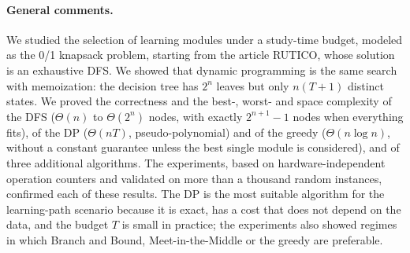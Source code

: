 \paragraph{General comments.} We studied the selection of learning modules under a study-time budget, modeled as the 0/1 knapsack problem, starting from the article RUTICO, whose solution is an exhaustive DFS. We showed that dynamic programming is the same search with memoization: the decision tree has $2^n$ leaves but only $n(T+1)$ distinct states. We proved the correctness and the best-, worst- and space complexity of the DFS ($\Theta(n)$ to $\Theta(2^n)$ nodes, with exactly $2^{n+1}-1$ nodes when everything fits), of the DP ($\Theta(nT)$, pseudo-polynomial) and of the greedy ($\Theta(n\log n)$, without a constant guarantee unless the best single module is considered), and of three additional algorithms. The experiments, based on hardware-independent operation counters and validated on more than a thousand random instances, confirmed each of these results. The DP is the most suitable algorithm for the learning-path scenario because it is exact, has a cost that does not depend on the data, and the budget $T$ is small in practice; the experiments also showed regimes in which Branch and Bound, Meet-in-the-Middle or the greedy are preferable.


